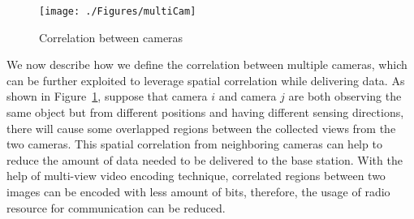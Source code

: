 \begin{figure}
\begin{center}
\texttt{[image: ./Figures/multiCam]}
\caption{\label{fig::multiCam}Correlation between cameras}
\end{center}
\end{figure}
We now describe how we define the correlation between multiple cameras, which can be further exploited to leverage spatial correlation while delivering data.
As shown in Figure~\ref{fig::multiCam}, suppose that camera $i$ and camera $j$ are both observing the same object but from different positions and having different sensing directions, there will cause some overlapped regions between the collected views from the two cameras.
This spatial correlation from neighboring cameras can help to reduce the amount of data needed to be delivered to the base station.
With the help of multi-view video encoding technique, correlated regions between two images can be encoded with less amount of bits, therefore, the usage of radio resource for communication can be reduced.
%
%

